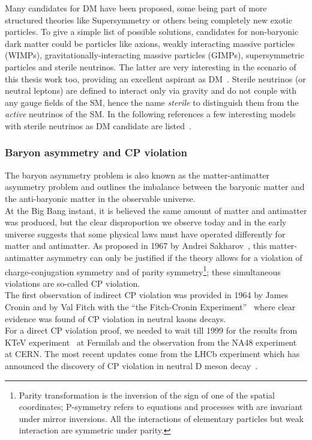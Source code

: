 Many candidates for DM have been proposed, some being part of more structured theories like Supersymmetry or others being completely new exotic particles. To give a simple list of possible solutions, candidates for non-baryonic dark matter could be particles like axions, weakly interacting massive particles (WIMPs),  gravitationally-interacting massive particles (GIMPs), supersymmetric particles and sterile neutrinos. The latter are very interesting in the scenario of this thesis work too, providing an excellent aspirant as DM~\cite{DREWES2017250,Cline_2020}. Sterile neutrinos (or neutral leptons) are defined to interact only via gravity and do not couple with any gauge fields of the SM, hence the name \emph{sterile} to distinguish them from the \emph{active} neutrinos of the SM. In the following references a few interesting models with sterile neutrinos as DM candidate are listed~\cite{Davidson_2008,PhysRevLett.72.17,PhysRevD.64.023501,KUSENKO20091,DOLGOV2002339}.


\subsubsection{Baryon asymmetry and CP violation}
The baryon asymmetry problem is also known as the matter-antimatter asymmetry problem and outlines the imbalance between the baryonic matter and the anti-baryonic matter in the observable universe.\\
 At the Big Bang instant, it is believed the same amount of matter and antimatter was produced, but the clear disproportion we observe today and in the early universe suggests that some physical laws must have operated differently for matter and antimatter. As proposed in 1967 by Andrei Sakharov~\cite{Sakharov:1967dj}, this matter-antimatter asymmetry can only be justified if the theory allows for a violation of charge-conjugation symmetry and of parity symmetry\footnote{Parity transformation is the inversion of the sign of one of the spatial coordinates; P-symmetry refers to equations and processes with are invariant under mirror inversions. All the interactions of elementary particles but weak interaction are symmetric under parity.}; these simultaneous violations are so-called CP violation. \\
The first observation of indirect CP violation was provided in 1964 by James Cronin and by Val Fitch with the ``the Fitch-Cronin Experiment''~\cite{PhysRevLett.13.138} where clear evidence was found of CP violation in neutral kaons decays.\\
For a direct CP violation proof, we needed to wait till 1999 for the results from KTeV experiment~\cite{Alavi_Harati_1999} at Fermilab and the observation from the NA48 experiment~\cite{Fanti_1999} at CERN. The most recent updates come from the LHCb experiment which has announced the discovery of CP violation in neutral D meson decay~\cite{PhysRevLett.122.211803}.

